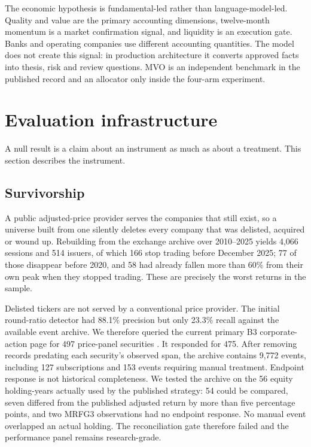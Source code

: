 \documentclass[10pt,conference]{IEEEtran}
\begin{document}
The economic hypothesis is fundamental-led rather than language-model-led. Quality and value are the primary accounting dimensions, twelve-month momentum is a market confirmation signal, and liquidity is an execution gate. Banks and operating companies use different accounting quantities. The model does not create this signal: in production architecture it converts approved facts into thesis, risk and review questions. MVO is an independent benchmark in the published record and an allocator only inside the four-arm experiment.

\section{Evaluation infrastructure}

A null result is a claim about an instrument as much as about a treatment. This section describes the instrument.

\subsection{Survivorship}

A public adjusted-price provider serves the companies that still exist, so a universe built from one silently deletes every company that was delisted, acquired or wound up. Rebuilding from the exchange archive over 2010--2025 yields 4{,}066 sessions and 514 issuers, of which 166 stop trading before December 2025; 77 of those disappear before 2020, and 58 had already fallen more than 60\% from their own peak when they stopped trading. These are precisely the worst returns in the sample.

Delisted tickers are not served by a conventional price provider. The initial round-ratio detector had 88.1\% precision but only 23.3\% recall against the available event archive. We therefore queried the current primary B3 corporate-action page for 497 price-panel securities \cite{b3events}. It responded for 475. After removing records predating each security's observed span, the archive contains 9,772 events, including 127 subscriptions and 153 events requiring manual treatment. Endpoint response is not historical completeness. We tested the archive on the 56 equity holding-years actually used by the published strategy: 54 could be compared, seven differed from the published adjusted return by more than five percentage points, and two MRFG3 observations had no endpoint response. No manual event overlapped an actual holding. The reconciliation gate therefore failed and the performance panel remains research-grade.
\end{document}
